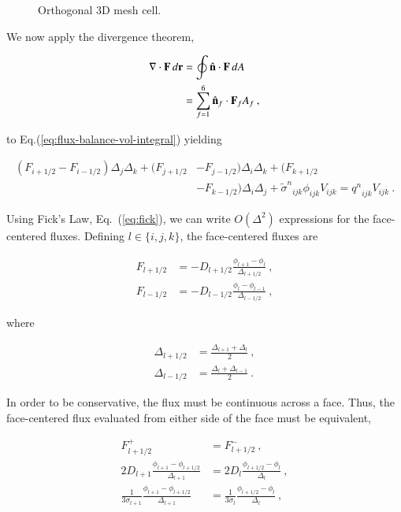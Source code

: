 \documentclass[preprint,12pt]{elsarticle}
\newcommand{\sign}{\ensuremath{\tilde{\sigma}^n}}
\newcommand{\qn}{\ensuremath{q^n}} \newcommand{\Tn}{\ensuremath{T^n}}
\newcommand{\Di}{\ensuremath{\Delta_i}}
\newcommand{\Dj}{\ensuremath{\Delta_j}}
\newcommand{\Dk}{\ensuremath{\Delta_k}}
\begin{document}
\begin{figure}[h!]
  \centerline{ }
  \caption{Orthogonal 3D mesh cell.}
  \label{fig:cell}
\end{figure}

We now apply the divergence theorem,

\begin{equation}
  \begin{split}
    \relax\nabla\cdot\mathbf{F}\,d\mathbf{r} &= \oint\hat{\mathbf{n}}\cdot\mathbf{F}\,dA\\ &=
    \sum_{f=1}^{6}\hat{\mathbf{n}}_f\cdot\mathbf{F}_f A_f\:,
  \end{split}
\end{equation}

to Eq.(\ref{eq:flux-balance-vol-integral}) yielding

\begin{equation}
  \begin{split}
    (F_{i+1/2} - F_{i-1/2})\Dj\Dk + (F_{j+1/2} &- F_{j-1/2})\Di\Dk +
    (F_{k+1/2}\\ &- F_{k-1/2})\Di\Dj + \sign_{ijk}\phi_{ijk}V_{ijk} =
    \qn_{ijk}V_{ijk}\:.
  \end{split}
  \label{eq:flux-balance-difference}
\end{equation}

Using Fick's Law, Eq.~(\ref{eq:fick}), we can write $O(\Delta^2)$
expressions for the face-centered fluxes.  Defining $l\in\{i,j,k\}$,
the face-centered fluxes are

\begin{align}
  F_{l+1/2} &= -D_{l+1/2}\frac{\phi_{l+1} -
    \phi_{l}}{\Delta_{l+1/2}}\:, \label{eq:F_l+1/2}\\ F_{l-1/2} &=
  -D_{l-1/2}\frac{\phi_{l} -
    \phi_{l-1}}{\Delta_{l-1/2}}\:, \label{eq:F_l-1/2}
\end{align}

where

\begin{align}
  \Delta_{l+1/2} &= \frac{\Delta_{l+1} +
    \Delta_{l}}{2}\:,\\ \Delta_{l-1/2} &= \frac{\Delta_{l} +
    \Delta_{l-1}}{2}\:.
\end{align}

In order to be conservative, the flux must be continuous across a
face.  Thus, the face-centered flux evaluated from either side of the
face must be equivalent,

\begin{equation}
  \begin{aligned}
    F_{l+1/2}^{+} &= F_{l+1/2}^{-}\:,\\ 2D_{l+1}\frac{\phi_{l+1} -
      \phi_{l+1/2}}{\Delta_{l+1}} &= 2D_{l}\frac{\phi_{l+1/2} -
      \phi_{l}}{\Delta_l}\:,\\ \frac{1}{3\sigma_{l+1}}\frac{\phi_{l+1}
      - \phi_{l+1/2}}{\Delta_{l+1}} &=
    \frac{1}{3\sigma_{l}}\frac{\phi_{l+1/2} - \phi_{l}}{\Delta_l}\:,
  \end{aligned}
\end{equation}
\end{document}
